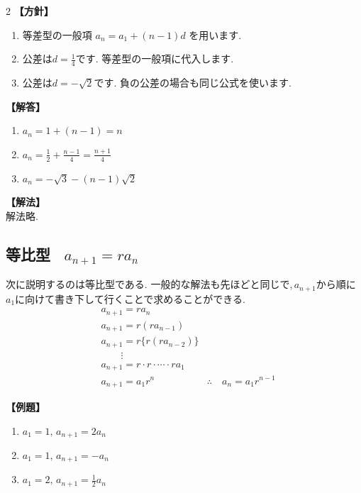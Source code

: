 \documentclass[dvipdfmx,a4paper,11pt,fleqn,openany]{jsbook}
\begin{document}
\begin{multicols*}{2}
      \noindent\textbf{【方針】}
      \begin{enumerate}[label=(\arabic*),parsep=3pt]
        \item 等差型の一般項
              $\displaystyle a_n=a_1+(n-1)d$
              を用います.
        \item 公差は$\displaystyle d=\frac14$です.
              等差型の一般項に代入します.
        \item 公差は$\displaystyle d=-\sqrt2$です.
              負の公差の場合も同じ公式を使います.
      \end{enumerate}

      \noindent\textbf{【解答】}
      \begin{enumerate}[label=(\arabic*),parsep=3pt]
        \item $\displaystyle a_n=1+(n-1)=n$
        \item $\displaystyle a_n=\frac12+\frac{n-1}{4}
              =\frac{n+1}{4}$
        \item $\displaystyle a_n=-\sqrt3-(n-1)\sqrt2$
      \end{enumerate}

      \noindent\textbf{【解法】}\\
      解法略.
    \subsection{等比型 \, $a_{n+1}=ra_n$}
      次に説明するのは等比型である.
      一般的な解法も先ほどと同じで,\,$a_{n+1}$から順に$a_1$に向けて書き下して行くことで求めることができる.
      \begin{align*}
        &a_{n+1}=ra_n\\
        &a_{n+1}=r(ra_{n-1})\\
        &a_{n+1}=r\{r(ra_{n-2})\}\\
        &\qquad \vdots\\
        &a_{n+1}=r\cdot r \cdot \cdots \cdot ra_1\\
        &a_{n+1}=a_1r^n
        &\therefore \quad a_n=a_1r^{n-1}
      \end{align*}

      \noindent \textbf{【例題】}
      \begin{enumerate}[label=(\arabic*),parsep=3pt]
        \item $\displaystyle a_1=1,\, a_{n+1}=2a_n$
        \item $\displaystyle a_1=1,\, a_{n+1}=-a_n$
        \item $\displaystyle a_1=2,\, a_{n+1}=\frac{1}{2}a_n$
      \end{enumerate}


\end{multicols*}
\end{document}
